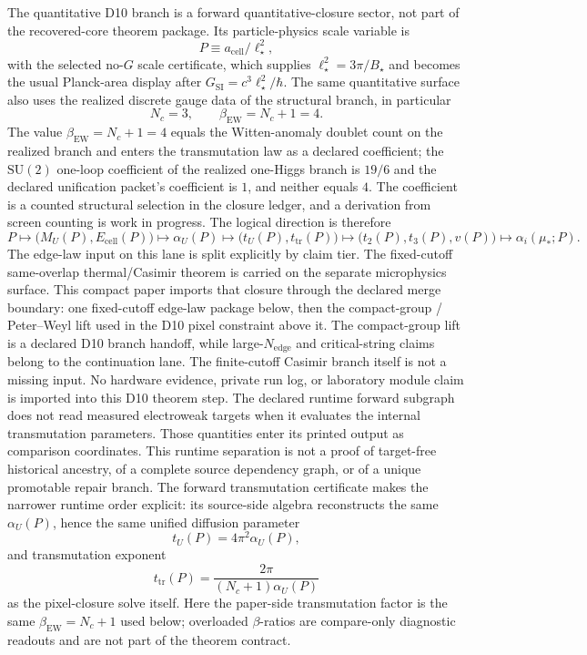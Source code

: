 \documentclass[11pt]{article}
\newcommand{\SU}{\mathrm{SU}}
\begin{document}
The quantitative D10 branch is a forward quantitative-closure sector, not part of the recovered-core theorem package. Its particle-physics scale variable is
\[
P \equiv a_{\mathrm{cell}}/\ell_\star^2,
\]
with the selected no-\(G\) scale certificate, which supplies \(\ell_\star^2=3\pi/B_\star\) and
becomes the usual Planck-area display after \(G_{\mathrm{SI}}=c^3\ell_\star^2/\hbar\). The same quantitative
surface also uses the realized discrete gauge data of the structural branch, in particular
\[
N_c=3,
\qquad
\beta_{\mathrm{EW}}=N_c+1=4.
\]
The value \(\beta_{\mathrm{EW}}=N_c+1=4\) equals the Witten-anomaly doublet count on the realized
branch and enters the transmutation law as a declared coefficient; the \(\SU(2)\) one-loop
coefficient of the realized one-Higgs branch is \(19/6\) and the declared unification packet's
coefficient is \(1\), and neither equals \(4\). The coefficient is a counted structural selection
in the closure ledger, and a derivation from screen counting is work in progress.
The logical direction is therefore
\[
P
\longmapsto
\bigl(M_U(P),E_{\mathrm{cell}}(P)\bigr)
\longmapsto
\alpha_U(P)
\longmapsto
\bigl(t_U(P),t_{\mathrm{tr}}(P)\bigr)
\longmapsto
\bigl(t_2(P),t_3(P),v(P)\bigr)
\longmapsto
\alpha_i(\mu_\ast;P).
\]
The edge-law input on this lane is split explicitly by claim tier. The fixed-cutoff
same-overlap thermal/Casimir theorem is carried on the separate microphysics surface. This
compact paper imports that closure through the declared merge boundary: one fixed-cutoff
edge-law package below, then the compact-group / Peter--Weyl lift used in the D10 pixel
constraint above it. The compact-group lift is a declared D10 branch handoff, while
large-\(N_{\mathrm{edge}}\) and critical-string claims belong to the continuation lane. The
finite-cutoff Casimir branch itself is not a missing input. No hardware evidence, private run
log, or laboratory module claim is imported into this D10 theorem step.
The declared runtime forward subgraph does not read measured electroweak targets when it evaluates
the internal transmutation parameters.  Those quantities enter its printed output as comparison
coordinates.  This runtime separation is not a proof of target-free historical ancestry,
of a complete source dependency graph, or of a unique promotable repair branch.
The forward transmutation certificate makes the narrower runtime order explicit: its source-side
algebra reconstructs the same \(\alpha_U(P)\), hence the same unified diffusion parameter
\[
t_U(P)=4\pi^2\alpha_U(P),
\]
and transmutation exponent
\[
t_{\mathrm{tr}}(P)=\frac{2\pi}{(N_c+1)\alpha_U(P)}
\]
as the pixel-closure solve itself. Here the paper-side transmutation factor is the same
\(\beta_{\mathrm{EW}}=N_c+1\) used below; overloaded \(\beta\)-ratios are compare-only
diagnostic readouts and are not part of the theorem contract.
\end{document}
